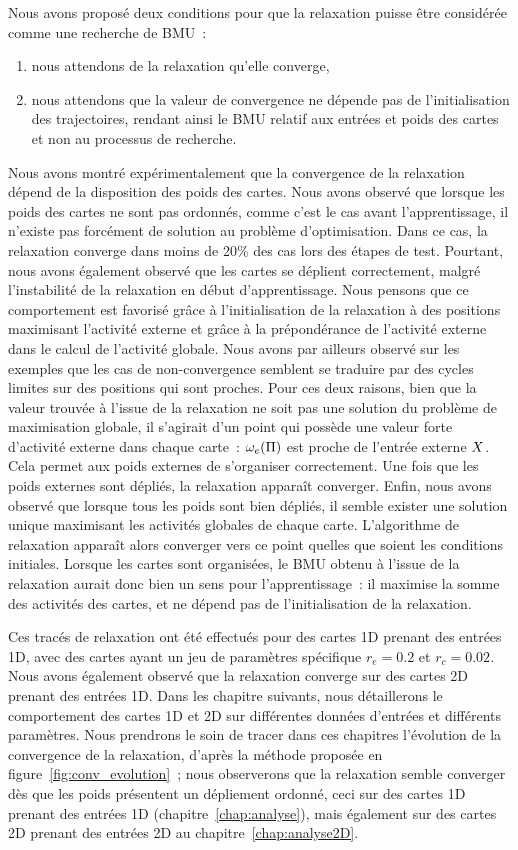 \documentclass[../main]{subfiles}
\begin{document}
Nous avons proposé deux conditions pour que la relaxation puisse être considérée comme une recherche de BMU~: 
\begin{enumerate}
	\item nous attendons de la relaxation qu'elle converge,
	\item nous attendons que la valeur de convergence ne dépende pas de l'initialisation des trajectoires, rendant ainsi le BMU relatif aux entrées et poids des cartes et non au processus de recherche.
\end{enumerate}

Nous avons montré expérimentalement que la convergence de la relaxation dépend de la disposition des poids des cartes. Nous avons observé que lorsque les poids des cartes ne sont pas ordonnés, comme c'est le cas avant l'apprentissage, il n'existe pas forcément de solution au problème d'optimisation. 
Dans ce cas, la relaxation converge dans moins de 20\% des cas lors des étapes de test.
Pourtant, nous avons également observé que les cartes se déplient correctement, malgré l'instabilité de la relaxation en début d'apprentissage. Nous pensons que ce comportement est favorisé grâce à l'initialisation de la relaxation à des positions maximisant l'activité externe et grâce à la prépondérance de l'activité externe dans le calcul de l'activité globale. Nous avons par ailleurs observé sur les exemples que les cas de non-convergence semblent se traduire par des cycles limites sur des positions qui sont proches. 
Pour ces deux raisons, bien que la valeur trouvée à l'issue de la relaxation ne soit pas une solution du problème de maximisation globale, il s'agirait d'un point qui possède une valeur forte d'activité externe dans chaque carte~: $\omega_e(\Pi)$ est proche de l'entrée externe $X$. Cela permet aux poids externes de s'organiser correctement. Une fois que les poids externes sont dépliés, la relaxation apparaît converger.
Enfin, nous avons observé que lorsque tous les poids sont bien dépliés, il semble exister une solution unique maximisant les activités globales de chaque carte. L'algorithme de relaxation apparaît alors converger vers ce point quelles que soient les conditions initiales.
Lorsque les cartes sont organisées, le BMU obtenu à l'issue de la relaxation aurait donc bien un sens pour l'apprentissage~: il maximise la somme des activités des cartes, et ne dépend pas de l'initialisation de la relaxation.


Ces tracés de relaxation ont été effectués pour des cartes 1D prenant des entrées 1D, avec des cartes ayant un jeu de paramètres spécifique $r_e = 0.2$ et $r_c = 0.02$. Nous avons également observé que la relaxation converge sur des cartes 2D prenant des entrées 1D.
Dans les chapitre suivants, nous détaillerons le comportement des cartes 1D et 2D sur différentes données d'entrées et différents paramètres. Nous prendrons le soin de tracer dans ces chapitres l'évolution de la convergence de la relaxation, d'après la méthode proposée en figure~\ref{fig:conv_evolution}~; nous observerons que la relaxation semble converger dès que les poids présentent un dépliement ordonné, ceci sur des cartes 1D prenant des entrées 1D (chapitre~\ref{chap:analyse}), mais également sur des cartes 2D prenant des entrées 2D au chapitre~\ref{chap:analyse2D}.

\ifSubfilesClassLoaded{
    \printbibliography
}{}
\end{document}
